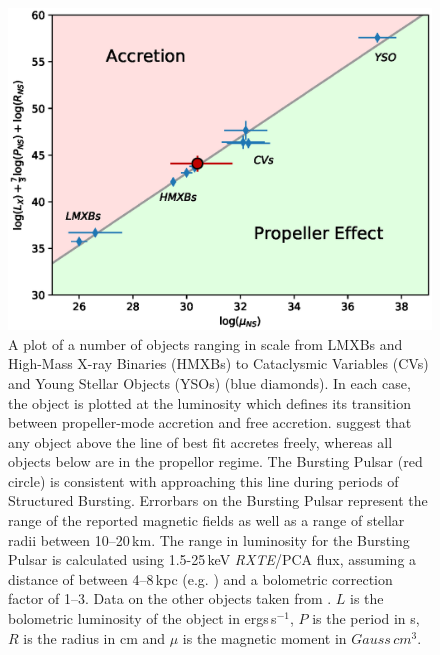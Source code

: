 \begin{figure}
 \centering
 \includegraphics[width=.82\linewidth, trim={0.6cm 0.1cm 1.0cm 1.1cm},clip]{images/propeff.eps}
 \caption[A plot of a number of objects ranging in scale from LMXBs and High-Mass X-ray Binaries (HMXBs) to Cataclysmic Variables (CVs) and Young Stellar Objects (YSOs). In each case, the object is plotted at the luminosity which defines its transition between propeller-mode accretion and free accretion.]{A plot of a number of objects ranging in scale from LMXBs and High-Mass X-ray Binaries (HMXBs) to Cataclysmic Variables (CVs) and Young Stellar Objects (YSOs) (blue diamonds). In each case, the object is plotted at the luminosity which defines its transition between propeller-mode accretion and free accretion. \citealp{Campana_PropBorder} suggest that any object above the line of best fit accretes freely, whereas all objects below are in the propellor regime. The Bursting Pulsar (red circle) is consistent with approaching this line during periods of Structured Bursting. Errorbars on the Bursting Pulsar represent the range of the reported magnetic fields as well as a range of stellar radii between 10--20\,km. The range in luminosity for the Bursting Pulsar is calculated using 1.5-25\,keV \indexpca\textit{RXTE}/PCA flux, assuming a distance of between 4--8\,kpc (e.g. \citealp{Kouveliotou_BP,Gosling_BPCompanion,Sanna_BP}) and a bolometric correction factor of 1--3.  Data on the other objects taken from \citealp{Campana_PropBorder}. $L$ is the bolometric luminosity of the object in ergs\,s$^{-1}$, $P$ is the period in s, $R$ is the radius in cm and $\mu$ is the magnetic moment in $Gauss\,cm^3$.}
 \label{fig:propBorder}
\end{figure}

